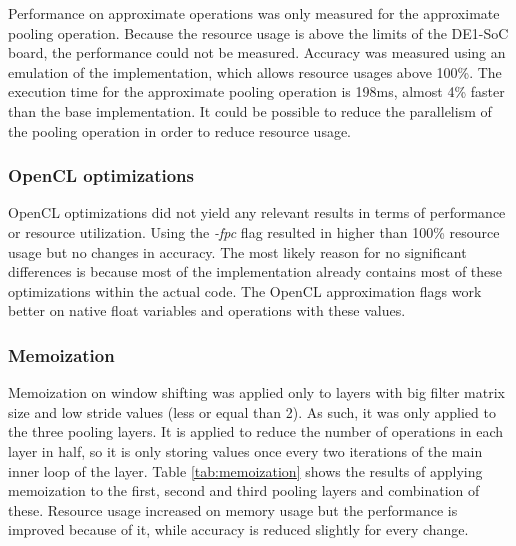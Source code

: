 \begin{enumerate}
Performance on approximate operations was only measured for the approximate
pooling operation. Because the resource usage is above the limits of the DE1-SoC board,
the performance could not be measured. Accuracy was measured using an emulation of the
implementation, which allows resource usages above 100\%. The execution time for
the approximate pooling operation is 198ms, almost 4\% faster than the base implementation.
It could be possible to reduce the parallelism of the pooling operation in order to reduce resource
usage.

\subsubsection{OpenCL optimizations}

OpenCL optimizations did not yield any relevant results in terms of performance or
resource utilization. Using the \textit{-fpc} flag resulted in higher than 100\% resource
usage but no changes in accuracy. The most likely reason for no significant differences
is because most of the implementation already contains most of these optimizations within
the actual code. The OpenCL approximation flags work better on native float variables
and operations with these values.

\subsubsection{Memoization}

Memoization on window shifting was applied only to layers with big filter matrix size and low
stride values (less or equal than 2). As such, it was only applied to the three pooling layers.
It is applied to reduce the number of operations in each layer in half, so it is only storing
values once every two iterations of the main inner loop of the layer.
Table \ref{tab:memoization} shows the results of applying memoization to the first, second and third
pooling layers and combination of these. Resource usage increased on memory usage but the performance
is improved because of it, while accuracy is reduced slightly for every change.


\end{enumerate}
